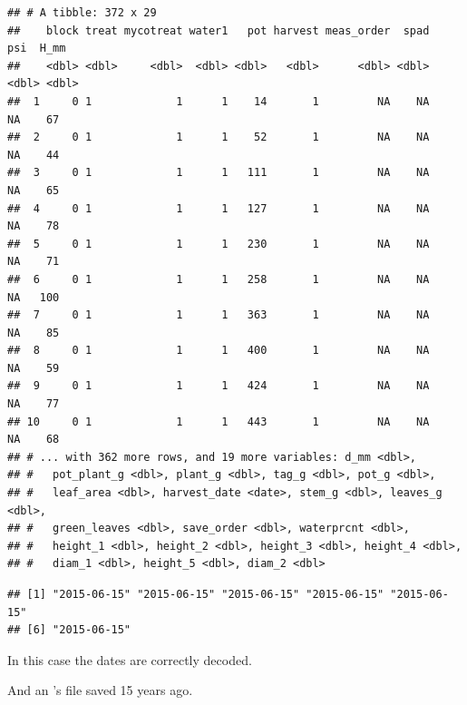 \documentclass[krantz2]{krantz}\usepackage{knitr}%
\begin{document}
\begin{knitrout}\footnotesize
{}\color{fgcolor}\begin{kframe}
\begin{alltt}
 \hlkwb{<-} \hlstd{(} \hlstd{=} \hlstd{)}
\end{alltt}
\begin{verbatim}
## # A tibble: 372 x 29
##    block treat mycotreat water1   pot harvest meas_order  spad   psi  H_mm
##    <dbl> <dbl>     <dbl>  <dbl> <dbl>   <dbl>      <dbl> <dbl> <dbl> <dbl>
##  1     0 1             1      1    14       1         NA    NA    NA    67
##  2     0 1             1      1    52       1         NA    NA    NA    44
##  3     0 1             1      1   111       1         NA    NA    NA    65
##  4     0 1             1      1   127       1         NA    NA    NA    78
##  5     0 1             1      1   230       1         NA    NA    NA    71
##  6     0 1             1      1   258       1         NA    NA    NA   100
##  7     0 1             1      1   363       1         NA    NA    NA    85
##  8     0 1             1      1   400       1         NA    NA    NA    59
##  9     0 1             1      1   424       1         NA    NA    NA    77
## 10     0 1             1      1   443       1         NA    NA    NA    68
## # ... with 362 more rows, and 19 more variables: d_mm <dbl>,
## #   pot_plant_g <dbl>, plant_g <dbl>, tag_g <dbl>, pot_g <dbl>,
## #   leaf_area <dbl>, harvest_date <date>, stem_g <dbl>, leaves_g <dbl>,
## #   green_leaves <dbl>, save_order <dbl>, waterprcnt <dbl>,
## #   height_1 <dbl>, height_2 <dbl>, height_3 <dbl>, height_4 <dbl>,
## #   diam_1 <dbl>, height_5 <dbl>, diam_2 <dbl>
\end{verbatim}
\begin{alltt}
\hlopt{$}
\end{alltt}
\begin{verbatim}
## [1] "2015-06-15" "2015-06-15" "2015-06-15" "2015-06-15" "2015-06-15"
## [6] "2015-06-15"
\end{verbatim}
\end{kframe}
\end{knitrout}

In this case the dates are correctly decoded.

And an 's  file saved 15 years ago.
\end{document}
